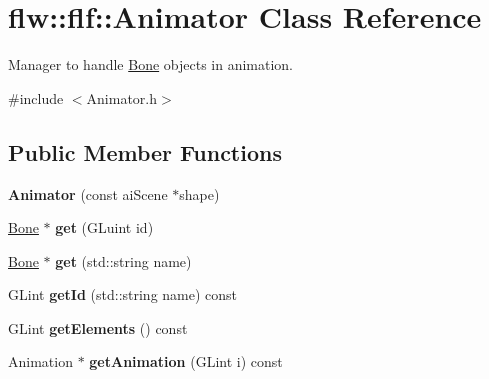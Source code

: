\hypertarget{classflw_1_1flf_1_1Animator}{}\section{flw\+:\+:flf\+:\+:Animator Class Reference}
\label{classflw_1_1flf_1_1Animator}


Manager to handle \hyperlink{classflw_1_1flf_1_1Bone}{Bone} objects in animation.  




{\ttfamily \#include $<$Animator.\+h$>$}

\subsection*{Public Member Functions}
\begin{DoxyCompactItemize}
\item 
{\bfseries Animator} (const ai\+Scene $\ast$shape)\hypertarget{classflw_1_1flf_1_1Animator_af0f2073ef0f4779905aba32657734361}{}\label{classflw_1_1flf_1_1Animator_af0f2073ef0f4779905aba32657734361}

\item 
\hyperlink{classflw_1_1flf_1_1Bone}{Bone} $\ast$ {\bfseries get} (G\+Luint id)\hypertarget{classflw_1_1flf_1_1Animator_ac76ca1f407b797dfe12d0a23924c8abb}{}\label{classflw_1_1flf_1_1Animator_ac76ca1f407b797dfe12d0a23924c8abb}

\item 
\hyperlink{classflw_1_1flf_1_1Bone}{Bone} $\ast$ {\bfseries get} (std\+::string name)\hypertarget{classflw_1_1flf_1_1Animator_a8cde1066efdc90569ba92507277ec14c}{}\label{classflw_1_1flf_1_1Animator_a8cde1066efdc90569ba92507277ec14c}

\item 
G\+Lint {\bfseries get\+Id} (std\+::string name) const \hypertarget{classflw_1_1flf_1_1Animator_a31a716a20ad4830f0ef58f4f17f278d1}{}\label{classflw_1_1flf_1_1Animator_a31a716a20ad4830f0ef58f4f17f278d1}

\item 
G\+Lint {\bfseries get\+Elements} () const \hypertarget{classflw_1_1flf_1_1Animator_a3b507030d1d767e828f0cea55e8fdd1f}{}\label{classflw_1_1flf_1_1Animator_a3b507030d1d767e828f0cea55e8fdd1f}

\item 
Animation $\ast$ {\bfseries get\+Animation} (G\+Lint i) const \hypertarget{classflw_1_1flf_1_1Animator_afee33976902c020a4fc6f23954bb9123}{}\label{classflw_1_1flf_1_1Animator_afee33976902c020a4fc6f23954bb9123}


\end{DoxyCompactItemize}
